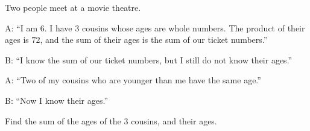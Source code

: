 Two people meet at a movie theatre.

A: ``I am $6$. I have $3$ cousins whose ages are whole numbers. The product of their ages is $72$, and the sum of their ages is the sum of our ticket numbers.''

B: ``I know the sum of our ticket numbers, but I still do not know their ages.''

A: ``Two of my cousins who are younger than me have the same age.''

B: ``Now I know their ages.''

Find the sum of the ages of the $3$ cousins, and their ages.
